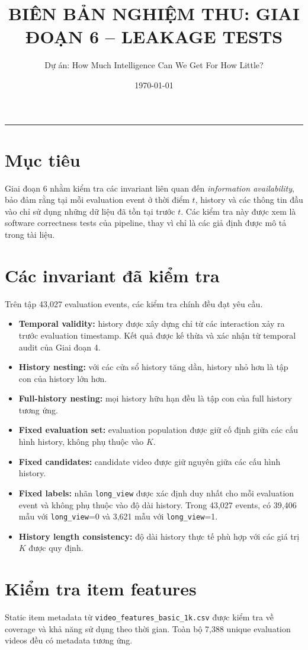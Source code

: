 \documentclass[12pt,a4paper]{article}
\title{\textbf{BIÊN BẢN NGHIỆM THU: GIAI ĐOẠN 6 -- LEAKAGE TESTS}}
\author{Dự án: How Much Intelligence Can We Get For How Little?}
\date{\today}
\begin{document}
\maketitle
\hrule
\vspace{15pt}

\section{Mục tiêu}
Giai đoạn 6 nhằm kiểm tra các invariant liên quan đến \textit{information availability}, bảo đảm rằng tại mỗi evaluation event ở thời điểm $t$, history và các thông tin đầu vào chỉ sử dụng những dữ liệu đã tồn tại trước $t$. Các kiểm tra này được xem là software correctness tests của pipeline, thay vì chỉ là các giả định được mô tả trong tài liệu.

\section{Các invariant đã kiểm tra}
Trên tập 43,027 evaluation events, các kiểm tra chính đều đạt yêu cầu.

\begin{itemize}[noitemsep]
    \item \textbf{Temporal validity:} history được xây dựng chỉ từ các interaction xảy ra trước evaluation timestamp. Kết quả được kế thừa và xác nhận từ temporal audit của Giai đoạn 4.
    \item \textbf{History nesting:} với các cửa sổ history tăng dần, history nhỏ hơn là tập con của history lớn hơn.
    \item \textbf{Full-history nesting:} mọi history hữu hạn đều là tập con của full history tương ứng.
    \item \textbf{Fixed evaluation set:} evaluation population được giữ cố định giữa các cấu hình history, không phụ thuộc vào $K$.
    \item \textbf{Fixed candidates:} candidate video được giữ nguyên giữa các cấu hình history.
    \item \textbf{Fixed labels:} nhãn \texttt{long\_view} được xác định duy nhất cho mỗi evaluation event và không phụ thuộc vào độ dài history. Trong 43,027 events, có 39,406 mẫu với \texttt{long\_view}=0 và 3,621 mẫu với \texttt{long\_view}=1.
    \item \textbf{History length consistency:} độ dài history thực tế phù hợp với các giá trị $K$ được quy định.
\end{itemize}

\section{Kiểm tra item features}
Static item metadata từ \texttt{video\_features\_basic\_1k.csv} được kiểm tra về coverage và khả năng sử dụng theo thời gian. Toàn bộ 7,388 unique evaluation videos đều có metadata tương ứng.
\end{document}
